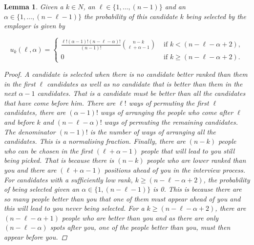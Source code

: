 \documentclass{article}
\newtheorem{lemma}{Lemma}
\begin{document}
\begin{lemma}\label{lemma:probability_alpha}
Given a $k\in N $, an $\ell \in \{1,\ldots,(n-1)\} $ and an  $\alpha \in \{1,\ldots , (n-\ell-1)\}$ the probability of this candidate $k$ being selected by the employer is given by

$$
    u_k(\ell,\alpha) = 
\begin{cases}
    \frac{\ell!(\alpha - 1)!(n-\ell-\alpha)!}{(n-1)!} \binom{n-k}{\ell+\alpha - 1} & \text{ if } k < (n-\ell-\alpha+2), \\
    0 & \text{ if } k \geq (n-\ell-\alpha+2).
\end{cases}
$$

\begin{proof}
A candidate is selected when there is no candidate better ranked than them in the first $\ell$ candidates as well as no candidate that is better than them in the next $\alpha - 1$ candidates. That is a candidate must be better than all the candidates that have come before him. There are $\ell!$ ways of permuting the first $\ell$ candidates, there are $(\alpha - 1)!$ ways of arranging the people who come after $\ell$ and before $k$ and $(n-\ell-\alpha)!$ ways of permuting the remaining candidates. The denominator $(n-1)!$ is the number of ways of arranging all the candidates. This is a normalising fraction. Finally, there are  $(n-k)$ people who can be chosen in the first $(\ell+\alpha-1)$ people that will lead to you still being picked. That is because there is $(n-k)$ people who are lower ranked than you and there are $(\ell+\alpha-1)$ positions ahead of you in the interview process. For candidates with a sufficiently low rank, $k \geq (n-\ell-\alpha+2)$, the probability of being selected given an $\alpha \in \{1, (n-\ell-1)\}$ is 0. This is because there are so many people better than you that one of them must appear ahead of you and this will lead to you never being selected. For a $k \geq (n-\ell-\alpha+2)$, there are $(n-\ell-\alpha+1)$ people who are better than you and as there are only $(n-\ell-\alpha)$ spots after you, one of the people better than you, must then appear before you.
\end{proof}
\end{lemma}
\end{document}
